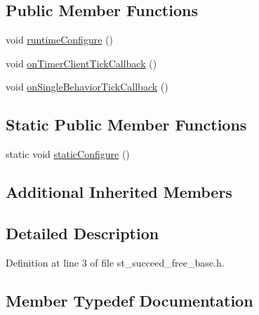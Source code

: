 \subsection*{Public Member Functions}
\begin{DoxyCompactItemize}
\item 
void \hyperlink{structsm__pr2__plugs_1_1StSucceedFreeBase_a90ef93147b370cf240d7800f1414648d}{runtime\+Configure} ()
\item 
void \hyperlink{structsm__pr2__plugs_1_1StSucceedFreeBase_a53328e9b7c378014ba1d19b835808582}{on\+Timer\+Client\+Tick\+Callback} ()
\item 
void \hyperlink{structsm__pr2__plugs_1_1StSucceedFreeBase_a18e063dd7dc924cd903824eaa2b680f7}{on\+Single\+Behavior\+Tick\+Callback} ()
\end{DoxyCompactItemize}
\subsection*{Static Public Member Functions}
\begin{DoxyCompactItemize}
\item 
static void \hyperlink{structsm__pr2__plugs_1_1StSucceedFreeBase_aeae400a9749af1efbe82e16b1b72529b}{static\+Configure} ()
\end{DoxyCompactItemize}
\subsection*{Additional Inherited Members}


\subsection{Detailed Description}


Definition at line 3 of file st\+\_\+succeed\+\_\+free\+\_\+base.\+h.



\subsection{Member Typedef Documentation}
\mbox{\label{structsm__pr2__plugs_1_1StSucceedFreeBase_a14771e3fa3c17d96f2b8c3f6f39089ec}} 
